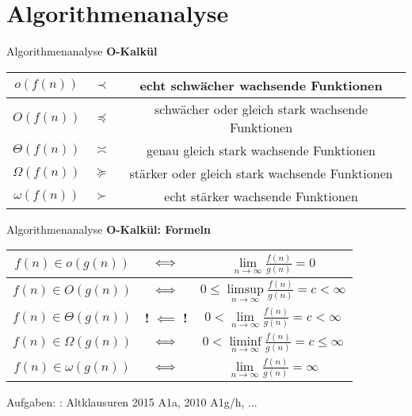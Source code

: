 \section{Algorithmenanalyse}

\begin{frame}{Algorithmenanalyse}
	\textbf{O-Kalkül} \\
	{
		\renewcommand{\arraystretch}{2}%
	
		\begin{center}
			\begin{tabular}{ | c | >{\Large}c | c | }
				\hline
				$     o (f(n))$ & $\prec$ & echt schwächer wachsende Funktionen
				\\ \hline
				$     O (f(n))$ & $\preccurlyeq$ & schwächer oder gleich stark wachsende Funktionen
				\\ \hline
				$\Theta (f(n))$ & $\asymp$ & genau gleich stark wachsende Funktionen
				\\ \hline
				$\Omega (f(n))$ & $\succcurlyeq$ & stärker oder gleich stark wachsende Funktionen
				\\ \hline
				$\omega (f(n))$ & $\succ$ & echt stärker wachsende Funktionen
				\\ \hline
			\end{tabular}
		\end{center}
	}
\end{frame}

\begin{frame}{Algorithmenanalyse}
	\textbf{O-Kalkül: Formeln} \\
	{
		\renewcommand{\arraystretch}{2}%
		\begin{center}
			\begin{tabular}{ | c | c | >{\quad}c<{\quad} | }
				\hline
				$f(n) \in o      (g(n))$ & $\Gdw$ & \(\lim\limits_{n \to \infty} \frac{f(n)}{g(n)} = 0\) 
				\\  \hline
				$f(n) \in O      (g(n))$ & $\Gdw$ & \(0 \leq \limsup\limits_{n \to \infty} \frac{f(n)}{g(n)} = c < \infty\)
				\\ \hline
				$f(n) \in \Theta (g(n))$ & \cellcolor{adaptingred} {\textbf{!} $\bm{\impliedby}$ \textbf{!}} & \(0 < \lim\limits_{n \to \infty} \frac{f(n)}{g(n)} = c < \infty\)
				\\ \hline
				$f(n) \in \Omega (g(n))$ & $\Gdw$ & \(0 < \liminf\limits_{n \to \infty} \frac{f(n)}{g(n)} = c \leq \infty\)
				\\ \hline
				$f(n) \in \omega (g(n))$ & $\Gdw$ & \(\lim\limits_{n \to \infty} \frac{f(n)}{g(n)} = \infty\)  %
				\\ \hline
			\end{tabular}
		\end{center}
	}
	\bigskip
	\small
	Aufgaben: \ZB: Altklausuren 2015 A1a, 2010 A1g/h, ...
\end{frame}

